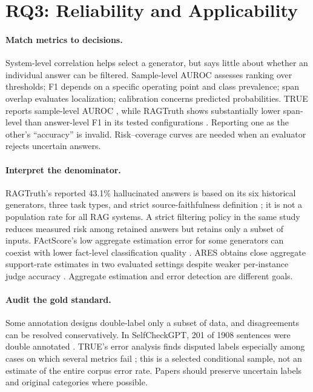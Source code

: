 \documentclass[11pt]{article}
\begin{document}
\section{RQ3: Reliability and Applicability}
\paragraph{Match metrics to decisions.} System-level correlation helps select a generator, but says little about whether an individual answer can be filtered. Sample-level AUROC assesses ranking over thresholds; F1 depends on a specific operating point and class prevalence; span overlap evaluates localization; calibration concerns predicted probabilities. TRUE reports sample-level AUROC \citep{C11}, while RAGTruth shows substantially lower span-level than answer-level F1 in its tested configurations \citep{C12}. Reporting one as the other's ``accuracy'' is invalid. Risk--coverage curves are needed when an evaluator rejects uncertain answers.

\paragraph{Interpret the denominator.} RAGTruth's reported 43.1\% hallucinated answers is based on its six historical generators, three task types, and strict source-faithfulness definition \citep{C12}; it is not a population rate for all RAG systems. A strict filtering policy in the same study reduces measured risk among retained answers but retains only a subset of inputs. FActScore's low aggregate estimation error for some generators can coexist with lower fact-level classification quality \citep{C07}. ARES obtains close aggregate support-rate estimates in two evaluated settings despite weaker per-instance judge accuracy \citep{I044}. Aggregate estimation and error detection are different goals.

\paragraph{Audit the gold standard.} Some annotation designs double-label only a subset of data, and disagreements can be resolved conservatively. In SelfCheckGPT, 201 of 1908 sentences were double annotated \citep{C08}. TRUE's error analysis finds disputed labels especially among cases on which several metrics fail \citep{C11}; this is a selected conditional sample, not an estimate of the entire corpus error rate. Papers should preserve uncertain labels and original categories where possible.
\end{document}
